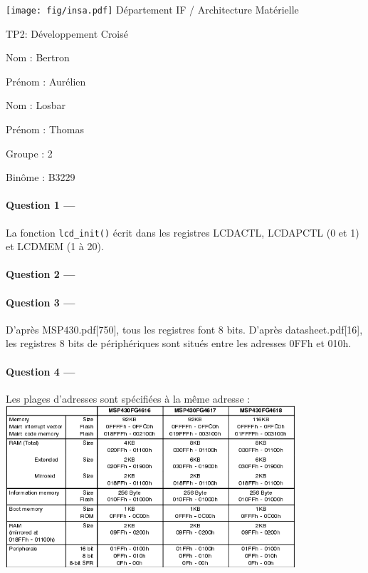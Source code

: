 \documentclass[a4paper,11pt,article]{memoir}
\renewcommand\title[1]{{\LARGE\fontfamily{pag}\selectfont #1}\par\bigskip}
\begin{document}
\texttt{[image: fig/insa.pdf]}
%
\hfill
%
{\selectfont Département IF / Architecture Matérielle}

\bigskip

\title{TP2: Développement Croisé}

\bigskip
\noindent\par\parbox{.48\textwidth}{Nom : Bertron} \parbox{.48\textwidth}{Prénom : Aurélien}
\bigskip
\noindent\par\parbox{.48\textwidth}{Nom : Losbar} \parbox{.48\textwidth}{Prénom : Thomas}
\bigskip
\noindent\par\parbox{.2\textwidth}{Groupe : 2} \parbox{.2\textwidth}{Binôme : B3229}

\bigskip

\paragraph{Question 1 ---}  La fonction \verb|lcd_init()| écrit dans les registres LCDACTL, LCDAPCTL (0 et 1) et LCDMEM (1 à 20).

\paragraph{Question 2 ---}  

\paragraph{Question 3 ---}  D'après MSP430.pdf[750], tous les registres font 8 bits. D'après datasheet.pdf[16], les registres 8 bits de périphériques sont situés entre les adresses 0FFh et 010h.

\paragraph{Question 4 ---}  Les plages d'adresses sont spécifiées à la même adresse :
\includegraphics[height=6cm]{fig/plagesAdressage.png}
\end{document}
